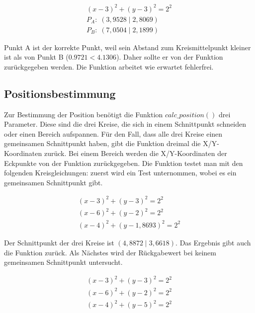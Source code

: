 \begin{equation*}
\label{eq:unit_test_abstand_zweier_punkte}
\begin{split}
(x - 3)^{2} + (y - 3)^{2} = 2^{2}\\
P_{A}: \; (3,9528 \;|\; 2,8069)\\
P_{B}: \; (7,0504 \;|\; 2,1899)
\end{split}
\end{equation*}

Punkt \si{A} ist der korrekte Punkt, weil sein Abstand zum Kreismittelpunkt kleiner ist als von Punkt \si{B} ($0.9721 < 4.1306$). Daher sollte er von der Funktion zurückgegeben werden. Die Funktion arbeitet wie erwartet fehlerfrei.

\subsection{Positionsbestimmung}
Zur Bestimmung der Position benötigt die Funktion $calc\_position()$ drei Parameter. Diese sind die drei Kreise, die sich in einem Schnittpunkt schneiden oder einen Bereich aufspannen. Für den Fall, dass alle drei Kreise einen gemeinsamen Schnittpunkt haben, gibt die Funktion dreimal die X/Y-Koordinaten zurück. Bei einem Bereich werden die X/Y-Koordinaten der Eckpunkte von der Funktion zurückgegeben. Die Funktion testet man mit den folgenden Kreisgleichungen: zuerst wird ein Test unternommen, wobei es ein gemeinsamen Schnittpunkt gibt.

\begin{equation*}
\label{eq:unit_test_positionsbestimmung}
\begin{split}
(x - 3)^{2} + (y - 3)^{2} = 2^{2} \\
(x - 6)^{2} + (y - 2)^{2} = 2^{2} \\
(x - 4)^{2} + (y - 1,8693)^{2} = 2^{2}
\end{split}
\end{equation*}

Der Schnittpunkt der drei Kreise ist $( 4,8872 \;|\; 3,6618)$. Das Ergebnis gibt auch die Funktion zurück. Als Nächstes wird der Rückgabewert bei keinem gemeinsamen Schnittpunkt untersucht.

\begin{equation*}
\label{eq:unit_test_positionsbestimmung}
\begin{split}
(x - 3)^{2} + (y - 3)^{2} = 2^{2} \\
(x - 6)^{2} + (y - 2)^{2} = 2^{2} \\
(x - 4)^{2} + (y - 5)^{2} = 2^{2}
\end{split}
\end{equation*}


